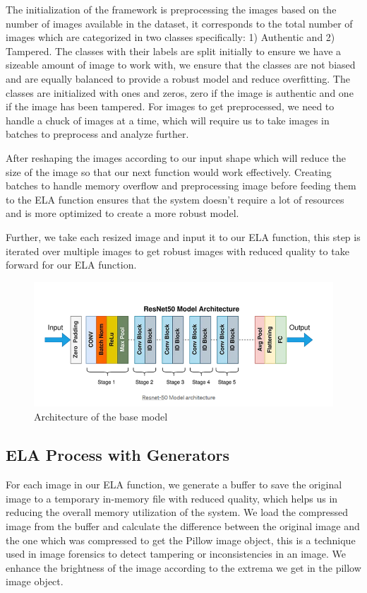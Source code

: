 \documentclass{ieeeaccess}
\begin{document}
The initialization of the framework is preprocessing the images based on the number of images available in the dataset, it corresponds to the total number of images which are categorized in two classes specifically: 1) Authentic and 2) Tampered. The classes with their labels are split initially to ensure we have a sizeable amount of image to work with, we ensure that the classes are not biased and are equally balanced to provide a robust model and reduce overfitting. The classes are initialized with ones and zeros, zero if the image is authentic and one if the image has been tampered. For images to get preprocessed, we need to handle a chuck of images at a time, which will require us to take images in batches to preprocess and analyze further. 

After reshaping the images according to our input shape which will reduce the size of the image so that our next function would work effectively. Creating batches to handle memory overflow and preprocessing image before feeding them to the ELA function ensures that the system doesn’t require a lot of resources and is more optimized to create a more robust model.

Further, we take each resized image and input it to our ELA function, this step is iterated over multiple images to get robust images with reduced quality  to take forward for our ELA function.

\begin{figure}
	\centering
	\includegraphics[width=\linewidth]{Base_Model.png}
	\caption{ Architecture of the base model}
	\label{base-model}
\end{figure} 

\subsection{ELA Process with Generators}
For each image in our ELA function, we generate a buffer to save the original image to a temporary in-memory file with reduced quality, which helps us in reducing the overall memory utilization of the system. We load the compressed image from the buffer and calculate the difference between the original image and the one which was compressed to get the Pillow image object, this is a technique used in image forensics to detect tampering or inconsistencies in an image. We enhance the brightness of the image according to the extrema we get in the pillow image object. 
\end{document}
